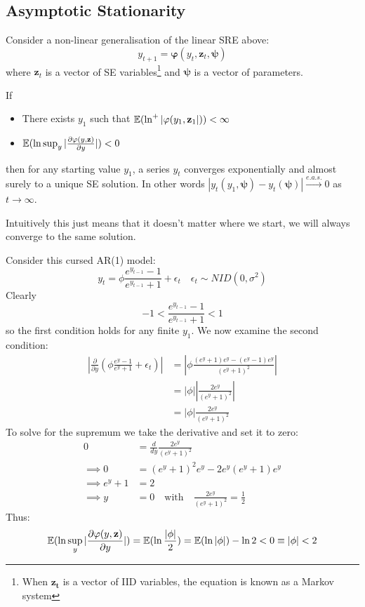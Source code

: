 \documentclass[DIV=14,titlepage=false]{scrreprt}
\begin{document}
\subsection{Asymptotic Stationarity}
Consider a non-linear generalisation of the linear SRE above:
\[
    y_{t+1} = \mathbf{\varphi}(y_t, \mathbf{z}_t, \mathbf{\psi})
\]
where $\mathbf{z}_t$ is a vector of SE variables\footnote{When $\mathbf{z_t}$ is a vector of IID variables, the equation is known as a Markov system} and $\mathbf{\psi}$ is a vector of parameters.
\begin{theorem}
    If \begin{itemize}
        \item There exists $y_1$ such that $\mathbb{E}(\ln^+|\varphi(y_1, \mathbf{z}_1|)) < \infty$
        \item $\mathbb{E}(\ln \sup_y |\frac{\partial \varphi(y, \mathbf{z})}{\partial y}|) < 0$
    \end{itemize}
    then for any starting value $y_1$, a series $y_t$ converges exponentially and almost surely to a unique SE solution. In other words $|y_t(y_1,\mathbf{\psi}) - y_t(\mathbf{\psi})| \overset{e.a.s.}{\to} 0$ as $t \to \infty$.
\end{theorem}
Intuitively this just means that it doesn't matter where we start, we will always converge to the same solution. 
\begin{example}
    Consider this cursed AR(1) model:
    \[
        y_t = \phi \frac{e^{y_{t-1}}-1}{e^{y_{t-1}}+1} + \epsilon_t \quad \epsilon_t \sim NID(0,\sigma^2)
    \]
    Clearly
    \[
        -1 < \frac{e^{y_{t-1}}-1}{e^{y_{t-1}}+1} < 1
    \]
    so the first condition holds for any finite $y_1$. We now examine the second condition:
    \begin{align*}
        \left| \frac{\partial}{\partial y} \left(\phi \frac{e^y-1}{e^y+1} + \epsilon_t \right)\right| &= \left| \phi \frac{(e^y+1)e^y - (e^y-1)e^y}{(e^y+1)^2} \right|\\
        &= |\phi| \left| \frac{2e^y}{(e^y+1)^2} \right|\\
        &= |\phi| \frac{2e^y}{(e^y+1)^2}
    \end{align*}
    To solve for the supremum we take the derivative and set it to zero:
    \begin{align*}
        0 &= \frac{d}{dy} \frac{2e^y}{(e^y+1)^2} \\
        \implies 0 &= (e^y+1)^2e^y - 2e^y(e^y+1)e^y\\
        \implies e^y + 1 &= 2\\
        \implies y &= 0 \quad \text{with} \quad \frac{2e^y}{(e^y+1)^2} = \frac{1}{2}
    \end{align*}
    Thus:
    \[
        \mathbb{E}(\ln \sup_y |\frac{\partial \varphi(y, \mathbf{z})}{\partial y}|) = \mathbb{E}(\ln \frac{|\phi|}{2}) = \mathbb{E}(\ln |\phi|) - \ln 2 < 0 \equiv |\phi| < 2
    \]
\end{example}
\end{document}
